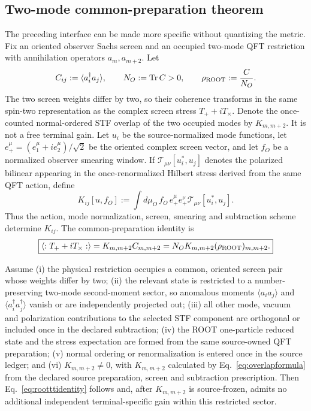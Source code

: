 \subsection{Two-mode common-preparation theorem}

The preceding interface can be made more specific without quantizing the
metric.  Fix an oriented observer Sachs screen and an occupied two-mode QFT
restriction with annihilation operators $a_m,a_{m+2}$.  Let
\begin{equation}
C_{ij}:=\langle a_i^\dagger a_j\rangle,
\qquad
N_O:=\operatorname{Tr}C>0,
\qquad
\rho_{\rm ROOT}:=\frac{C}{N_O}.
\label{eq:rootdensity}
\end{equation}
The two screen weights differ by two, so their coherence transforms in the
same spin-two representation as the complex screen stress
$T_+ + iT_\times$.  Denote the once-counted normal-ordered STF overlap of the
two occupied modes by $K_{m,m+2}$.  It is not a free terminal gain.  Let
$u_i$ be the source-normalized mode functions, let
$e_+^\mu=(e_1^\mu+i e_2^\mu)/\sqrt{2}$ be the oriented complex screen vector,
and let $f_O$ be a normalized observer smearing window.  If
$\mathcal T_{\mu\nu}[u_i^*,u_j]$ denotes the polarized bilinear appearing in
the once-renormalized Hilbert stress derived from the same QFT action, define
\begin{equation}
K_{ij}[u,f_O]
:=\int d\mu_O\,f_O\,e_+^\mu e_+^\nu
\mathcal T_{\mu\nu}[u_i^*,u_j].
\label{eq:overlapformula}
\end{equation}
Thus the action, mode normalization, screen, smearing and subtraction scheme
determine $K_{ij}$.  The common-preparation identity is
\begin{equation}
\boxed{
\left\langle :T_+ + iT_\times: \right\rangle
=K_{m,m+2}C_{m,m+2}
=N_O K_{m,m+2}(\rho_{\rm ROOT})_{m,m+2}.}
\label{eq:rootttidentity}
\end{equation}

\begin{proposition}
\label{prop:roottt}
Assume (i) the physical restriction occupies a common, oriented screen pair
whose weights differ by two; (ii) the relevant state is restricted to a
number-preserving two-mode second-moment sector, so anomalous moments
$\langle a_i a_j\rangle$ and $\langle a_i^\dagger a_j^\dagger\rangle$ vanish
or are independently projected out; (iii) all other mode, vacuum and
polarization contributions to the selected STF component are orthogonal or
included once in the declared subtraction; (iv) the ROOT one-particle reduced
state and the stress expectation are formed from the same source-owned QFT
preparation; (v) normal
ordering or renormalization is entered once in the source ledger; and (vi)
$K_{m,m+2}\neq0$, with $K_{m,m+2}$ calculated by
Eq.~\eqref{eq:overlapformula} from the declared source preparation, screen and
subtraction prescription.  Then Eq.~\eqref{eq:rootttidentity} follows and,
after $K_{m,m+2}$ is source-frozen, admits no additional independent
terminal-specific gain within this restricted sector.
\end{proposition}

